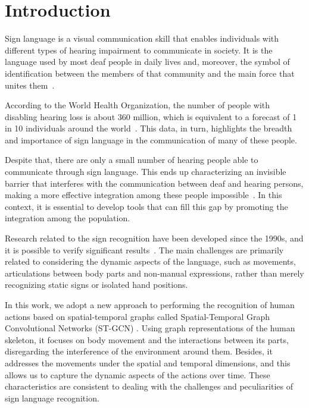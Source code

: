 \section{Introduction} 
\label{sec:introduction}

Sign language is a visual communication skill that enables individuals with different types of hearing impairment to communicate in society. It is the language used by most deaf people in daily lives and, moreover, the symbol of identification between the members of that community and the main force that unites them~\cite{pereira-choi-2011}.

According to the World Health Organization, the number of people with disabling hearing loss is about 360 million, which is equivalent to a forecast of 1 in 10 individuals around the world~\cite{who-2018}. This data, in turn, highlights the breadth and importance of sign language in the communication of many of these people.

Despite that, there are only a small number of hearing people able to communicate through sign language. This ends up characterizing an invisible barrier that interferes with the communication between deaf and hearing persons, making a more effective integration among these people impossible~\cite{peres-2006}. In this context, it is essential to develop tools that can fill this gap by promoting the integration among the population.

Research related to the sign recognition have been developed since the 1990s, and it is possible to verify significant results~\cite{lim-2016,recent-advances-dl-2017}. The main challenges are primarily related to considering the dynamic aspects of the language, such as movements, articulations between body parts and non-manual expressions, rather than merely recognizing static signs or isolated hand positions.

In this work, we adopt a new approach to performing the recognition of human actions based on spatial-temporal graphs called Spatial-Temporal Graph Convolutional Networks (ST-GCN) \cite {st-gcn-2018}. Using graph representations of the human skeleton, it focuses on body movement and the interactions between its parts, disregarding the interference of the environment around them. Besides, it addresses the movements under the spatial and temporal dimensions, and this allows us to capture the dynamic aspects of the actions over time. These characteristics are consistent to dealing with the challenges and peculiarities of sign language recognition.

